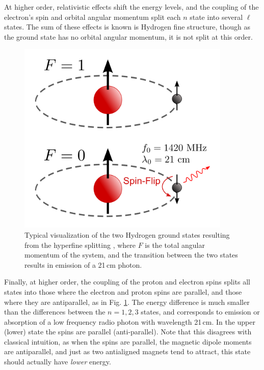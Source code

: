 At higher order, relativistic effects shift the energy levels, and the coupling of the electron's spin and orbital angular momentum split each $n$ state into several $\ell$ states. The sum of these effects is known is Hydrogen fine structure, though as the ground state has no orbital angular momentum, it is not split at this order. 

\begin{figure}
	\centering
	\includegraphics[width=4in]{chap0_intro/500px-Hydrogen-SpinFlip.svg.png}
	\caption[Diagram of the two Hydrogen ground states resulting from hyperfine splitting.]{Typical visualization of the two Hydrogen ground states resulting from the hyperfine splitting \citep{HydrogenSpinFlipGraphic}, where $F$ is the total angular momentum of the system, and the transition between the two states results in emission of a 21\,cm photon.}
	\label{fig:HydrogenSpinFlipGraphic}
\end{figure}

Finally, at higher order, the coupling of the proton and electron spins splits all states into those where the electron and proton spins are parallel, and those where they are antiparallel, as in Fig. \ref{fig:HydrogenSpinFlipGraphic}. The energy difference is much smaller than the differences between the $n=1,2,3$ states, and corresponds to emission or absorption of a low frequency radio photon with wavelength 21\,cm. In the upper (lower) state the spins are parallel (anti-parallel). Note that this disagrees with classical intuition, as when the spins are parallel, the magnetic dipole moments are antiparallel, and just as two antialigned magnets tend to attract, this state should actually have \textit{lower} energy. 

